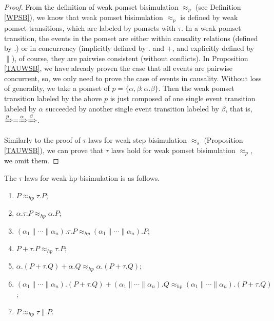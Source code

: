 \begin{proof}
From the definition of weak pomset bisimulation $\approx_{p}$ (see Definition \ref{WPSB}), we know that weak pomset bisimulation $\approx_{p}$ is defined by weak pomset transitions, which are labeled by pomsets with $\tau$. In a weak pomset transition, the events in the pomset are either within causality relations (defined by $.$) or in concurrency (implicitly defined by $.$ and $+$, and explicitly defined by $\parallel$), of course, they are pairwise consistent (without conflicts). In Proposition \ref{TAUWSB}, we have already proven the case that all events are pairwise concurrent, so, we only need to prove the case of events in causality. Without loss of generality, we take a pomset of $p=\{\alpha,\beta:\alpha.\beta\}$. Then the weak pomset transition labeled by the above $p$ is just composed of one single event transition labeled by $\alpha$ succeeded by another single event transition labeled by $\beta$, that is, $\xRightarrow{p}=\xRightarrow{\alpha}\xRightarrow{\beta}$.

Similarly to the proof of $\tau$ laws for weak step bisimulation $\approx_{s}$ (Proposition \ref{TAUWSB}), we can prove that $\tau$ laws hold for weak pomset bisimulation $\approx_{p}$, we omit them.
\end{proof}

\begin{proposition}\label{TAUWHPB}
The $\tau$ laws for weak hp-bisimulation is as follows.
\begin{enumerate}
  \item $P\approx_{hp} \tau.P$;
  \item $\alpha.\tau.P\approx_{hp} \alpha.P$;
  \item $(\alpha_1\parallel\cdots\parallel\alpha_n).\tau.P\approx_{hp} (\alpha_1\parallel\cdots\parallel\alpha_n).P$;
  \item $P+\tau.P\approx_{hp} \tau.P$;
  \item $\alpha.(P+\tau.Q)+\alpha.Q\approx_{hp}\alpha.(P+\tau.Q)$;
  \item $(\alpha_1\parallel\cdots\parallel\alpha_n).(P+\tau.Q)+ (\alpha_1\parallel\cdots\parallel\alpha_n).Q\approx_{hp} (\alpha_1\parallel\cdots\parallel\alpha_n).(P+\tau.Q)$;
  \item $P\approx_{hp} \tau\parallel P$.
\end{enumerate}
\end{proposition}

